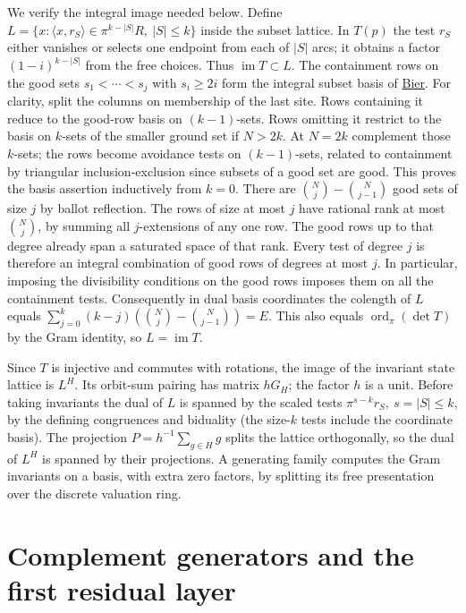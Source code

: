 \documentclass[11pt]{article}
\newcommand{\ord}{\operatorname{ord}_{\pi}}
\newcommand{\im}{\operatorname{im}}
\begin{document}
We verify the integral image needed below. Define
\(L=\{x:\langle x,r_S\rangle\in\pi^{k-|S|}R,\ |S|\le k\}\)
inside the subset lattice. In \(T(p)\) the test \(r_S\) either vanishes
or selects one endpoint from each of \(|S|\) arcs; it obtains a factor
\((1-i)^{k-|S|}\) from the free choices. Thus \(\im T\subset L\).
The containment rows on the good sets \(s_1<\cdots<s_j\) with
\(s_i\ge2i\) form the integral subset basis of
\href{https://doi.org/10.1006/eujc.1993.1001}{Bier}.
For clarity, split the columns on membership of the last site.
Rows containing it reduce to the good-row basis on \((k-1)\)-sets.
Rows omitting it restrict to the basis on \(k\)-sets of the smaller
ground set if \(N>2k\). At \(N=2k\) complement those \(k\)-sets;
the rows become avoidance tests on \((k-1)\)-sets, related to containment
by triangular inclusion-exclusion since subsets of a good set are good.
This proves the basis assertion inductively from \(k=0\).
There are \(\binom Nj-\binom N{j-1}\) good sets of size \(j\) by ballot
reflection. The rows of size at most \(j\) have rational rank at most
\(\binom Nj\), by summing all \(j\)-extensions of any one row. The
good rows up to that degree already span a saturated space of that rank.
Every test of degree \(j\) is therefore an integral combination of good
rows of degrees at most \(j\). In particular, imposing the divisibility
conditions on the good rows imposes them on all the containment tests.
Consequently in dual basis coordinates the colength of \(L\) equals
\(\sum_{j=0}^k(k-j)(\binom Nj-\binom N{j-1})=E\).
This also equals \(\ord(\det T)\) by the Gram identity, so \(L=\im T\).

Since \(T\) is injective and commutes with rotations, the image of the
invariant state lattice is \(L^H\). Its orbit-sum pairing has matrix
\(hG_H\); the factor \(h\) is a unit. Before taking invariants the
dual of \(L\) is spanned by the scaled tests
\(\pi^{s-k}r_S,\ s=|S|\le k\), by the defining congruences and
biduality (the size-\(k\) tests include the coordinate basis).
The projection \(P=h^{-1}\sum_{g\in H}g\) splits the lattice
orthogonally, so the dual of \(L^H\) is spanned by their projections.
A generating family computes the Gram
invariants on a basis, with extra zero factors, by splitting its free
presentation over the discrete valuation ring.

\section{Complement generators and the first residual layer}
\end{document}
